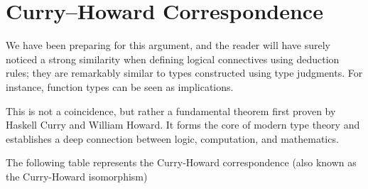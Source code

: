 \section{Curry–Howard Correspondence}
We have been preparing for this argument, and the reader will have surely noticed a strong similarity when defining logical connectives using deduction rules; they are remarkably similar to types constructed using type judgments. For instance, function types can be seen as implications.

This is not a coincidence, but rather a fundamental theorem first proven by Haskell Curry and William Howard. It forms the core of modern type theory and establishes a deep connection between logic, computation, and mathematics.

The following table represents the Curry-Howard correspondence (also known as the Curry-Howard isomorphism)
